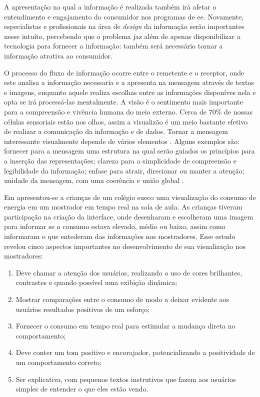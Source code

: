 A apresentação na qual a informação é realizada também irá afetar o entendimento
e engajamento do consumidor nos programas de \gls{ee}. Novamente, especialistas
e profissionais na área de \emph{design} da informação serão importantes nesse
intuíto, percebendo que o problema jaz além de apenas disponibilizar a
tecnologia para fornecer a informação: também será necessário tornar a
informação atrativa ao consumidor.

O processo do fluxo de informação ocorre entre o remetente e o receptor, onde
este analisa a informação necessaria e a apresenta na mensagem através de textos
e imagens, enquanto aquele realiza escolhas entre as informações disponíves nela
e opta se irá processá-las mentalmente. A visão é o sentimento mais 
importante para a compreensão e vivência humana do meio externo. 
Cerca de 70\% de nossas células sensoriais estão nos olhos, assim a visualizão 
é um meio bastante efetivo de realizar a comunicação da informação e de dados. 
Tornar a mensagem interessante visualmente depende de vários elementos 
\cite{2012_visualisation_sweden}. Alguns exemplos são: fornecer para a 
mensagem uma estrutura na qual serão guiados os princípios para
a inserção das representações; clareza para a simplicidade de compreensão e
legibilidade da informação; enfase para atrair, direcionar ou manter a atenção;
unidade da mensagem, com uma coerência e união global \cite{it_depends}.

Em \cite{2012_visualisation_sweden} apresentou-se a crianças de um colégio sueco
uma visualização do consumo de energia em um mostrador em tempo real na sala de 
aula. As crianças tiveram participação na criação da interface, onde desenharam
e escolheram uma imagem para informar se o consumo estava elevado, médio ou
baixo, assim como informaram o que entederam das informações nos mostradores.
Esse estudo revelou cinco aspectos importantes no desenvolvimento de sua
visualização nos mostradores:

\begin{enumerate}
\item Deve chamar a atenção dos usuários, realizando o uso de cores brilhantes,
contrastes e quando possível uma exibição dinâmica; 
\item Mostrar comparações entre o consumo de modo a deixar evidente aos usuários
resultados positivos de um esforço;
\item Fornecer o consumo em tempo real para estimular a mudança direta no
comportamento;
\item Deve conter um tom positivo e encorajador, potencializando a positividade
de um comportamento correto;
\item Ser explicativa, com pequenos textos instrutivos que fazem aos usuários
simples de entender o que eles estão vendo.
\end{enumerate}


